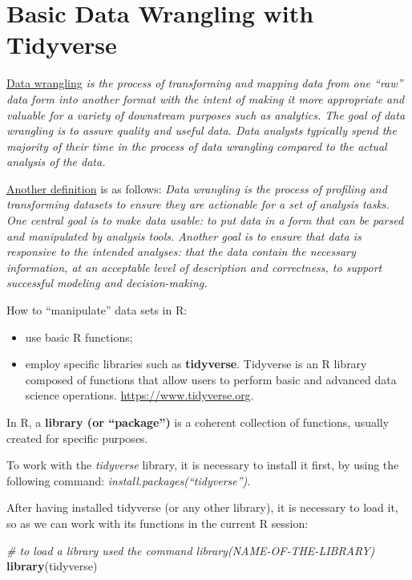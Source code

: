 \documentclass[
]{article}
\newenvironment{Shaded}{\begin{snugshade}}{\end{snugshade}}
\newcommand{\CommentTok}[1]{\textcolor[rgb]{0.56,0.35,0.01}{\textit{#1}}}
\newcommand{\FunctionTok}[1]{\textcolor[rgb]{0.13,0.29,0.53}{\textbf{#1}}}
\newcommand{\NormalTok}[1]{#1}
\providecommand{\tightlist}{%
  \setlength{\itemsep}{0pt}\setlength{\parskip}{0pt}}
\begin{document}
\section{Basic Data Wrangling with Tidyverse}\label{basic-data-wrangling-with-tidyverse}

\href{https://en.wikipedia.org/wiki/Data_wrangling}{Data wrangling} \emph{is the process of transforming and mapping data from one ``raw'' data form into another format with the intent of making it more appropriate and valuable for a variety of downstream purposes such as analytics. The goal of data wrangling is to assure quality and useful data. Data analysts typically spend the majority of their time in the process of data wrangling compared to the actual analysis of the data.}

\href{https://link.springer.com/referenceworkentry/10.1007\%2F978-3-319-63962-8_9-1}{Another definition} is as follows: \emph{Data wrangling is the process of profiling and transforming datasets to ensure they are actionable for a set of analysis tasks. One central goal is to make data usable: to put data in a form that can be parsed and manipulated by analysis tools. Another goal is to ensure that data is responsive to the intended analyses: that the data contain the necessary information, at an acceptable level of description and correctness, to support successful modeling and decision-making.}

How to ``manipulate'' data sets in R:

\begin{itemize}
\tightlist
\item
  use basic R functions;
\item
  employ specific libraries such as \textbf{tidyverse}. Tidyverse is an R library composed of functions that allow users to perform basic and advanced data science operations. \url{https://www.tidyverse.org}.
\end{itemize}

In R, a \textbf{library (or ``package'')} is a coherent collection of functions, usually created for specific purposes.

To work with the \emph{tidyverse} library, it is necessary to install it first, by using the following command: \emph{install.packages(``tidyverse'')}.

After having installed tidyverse (or any other library), it is necessary to load it, so as we can work with its functions in the current R session:

\begin{Shaded}
\begin{Highlighting}[]
\CommentTok{\# to load a library used the command library(NAME{-}OF{-}THE{-}LIBRARY)}
\FunctionTok{library}\NormalTok{(tidyverse)}
\end{Highlighting}
\end{Shaded}
\end{document}

